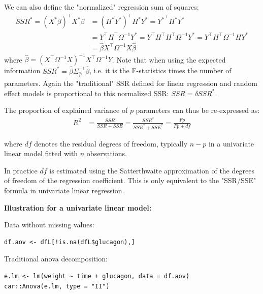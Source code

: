 \documentclass[12pt]{article}
\newcommand\Warning[1][3ex]{%
\renewcommand\stacktype{L}%
\scaleto{\stackon[1.3pt]{\color{red}$\triangle$}{\tiny\bfseries !}}{#1}%
\xspace
}
\newcommand\trans[1]{{#1}^\intercal}%
\begin{document}
\bigskip

We can also define the "normalized" regression sum of squares:
\begin{align*}
SSR^* = \trans{(X^*\beta)}X^*\beta &= \trans{\left(H^* Y^*\right)} H^* Y^* = \trans{Y^*} H^* Y^* \\
&= \trans{Y} \trans{H} \Omega^{-1} Y^* = \trans{Y} \trans{H} \trans{H} \Omega^{-1} Y^* = \trans{Y} \trans{H} \Omega^{-1} H Y^* \\
&= \widehat{\beta} \trans{X} \Omega^{-1} X \widehat{\beta}
\end{align*}
where \(\widehat{\beta}= \left(\trans{X}\Omega^{-1}
X\right)^{-1}\trans{X} \Omega^{-1} Y\). Note that when using the
expected information \(SSR^* = \widehat{\beta}
\Sigma^{-1}_{\widehat{\beta}} \widehat{\beta}\), i.e. it is the
F-statistics times the number of parameters. Again the "traditional"
SSR defined for linear regression and random effect models is
proportional to this normalized SSR: \(SSR=\delta SSR^{*}\).

\bigskip

The proportion of explained variance of \(p\) parameters can thus be
re-expressed as:
\begin{align*}
R^2 &= \frac{SSR}{SSR+SSE} = \frac{SSR^*}{SSR^*+SSE^*}= \frac{Fp}{Fp+df}
\end{align*}

where \(df\) denotes the residual degrees of freedom, typically
\(n-p\) in a univariate linear model fitted with \(n\)
observations. \newline \Warning In practice \(df\) is estimated using the
Satterthwaite approximation of the degrees of freedom of the
regression coefficient. This is only equivalent to the "SSR/SSE"
formula in univariate linear regression.

\bigskip
\bigskip

\textbf{Illustration for a univariate linear model:}

\bigskip

Data without missing values:
\lstset{language=r,label= ,caption= ,captionpos=b,numbers=none}
\begin{lstlisting}
df.aov <- dfL[!is.na(dfL$glucagon),]
\end{lstlisting}

Traditional anova decomposition:
\lstset{language=r,label= ,caption= ,captionpos=b,numbers=none}
\begin{lstlisting}
e.lm <- lm(weight ~ time + glucagon, data = df.aov)
car::Anova(e.lm, type = "II")
\end{lstlisting}
\end{document}
